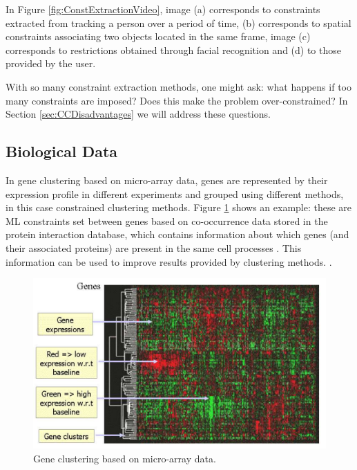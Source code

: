 In Figure \ref{fig:ConstExtractionVideo}, image (a) corresponds to constraints extracted from tracking a person over a period of time, (b) corresponds to spatial constraints associating two objects located in the same frame, image (c) corresponds to restrictions obtained through facial recognition and (d) to those provided by the user.

With so many constraint extraction methods, one might ask: what happens if too many constraints are imposed? Does this make the problem over-constrained? In Section \ref{sec:CCDisadvantages} we will address these questions.

\subsection{Biological Data}

In gene clustering based on micro-array data, genes are represented by their expression profile in different experiments and grouped using different methods, in this case constrained clustering methods. Figure \ref{fig:GeneticApp} shows an example: these are \acf{ML} constraints set between genes based on co-occurrence data stored in the protein interaction database, which contains information about which genes (and their associated proteins) are present in the same cell processes \cite{xenarios2001dip}. This information can be used to improve results provided by clustering methods. \cite{segal2003discovering}.

\begin{figure}[!h]
	\centering
	\includegraphics[scale=0.3]{gfx/ConstClust/Genetica/Genes} 
	\caption[Gene clustering based on micro-array data.]{Gene clustering based on micro-array data. \cite{davidson2007survey}}\label{fig:GeneticApp}
\end{figure}

